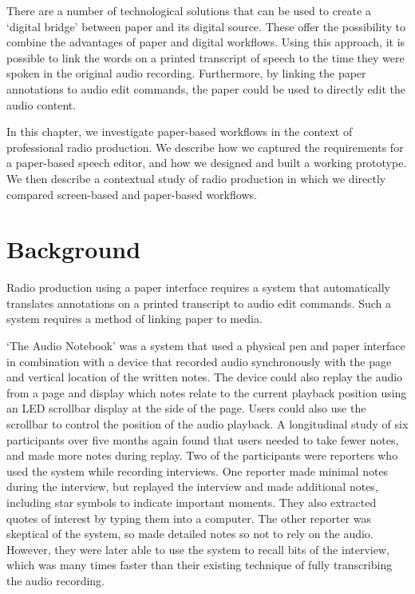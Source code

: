 There are a number of technological solutions that can be used to create a `digital bridge' between paper and
its digital source. These offer the possibility to combine the advantages of paper and digital workflows. Using this
approach, it is possible to link the words on a printed transcript of speech to the time they were spoken in the
original audio recording. Furthermore, by linking the paper annotations to audio edit commands, the paper could be used
to directly edit the audio content.

In this chapter, we investigate paper-based workflows in the context of professional radio production. We describe how
we captured the requirements for a paper-based speech editor, and how we designed and built a working prototype. We
then describe a contextual study of radio production in which we directly compared screen-based and paper-based
workflows. 

\section{Background}\label{sec:paper-background}
Radio production using a paper interface requires a system that automatically translates annotations on a printed
transcript to audio edit commands. Such a system requires a method of linking paper to media.

`The Audio Notebook' \citep{Stifelman2001} was a system that used a physical pen and paper interface in combination
with a device that recorded audio synchronously with the page and vertical location of the written notes.  The device
could also replay the audio from a page and display which notes relate to the current playback position using an LED
scrollbar display at the side of the page. Users could also use the scrollbar to control the position of the audio
playback.  A longitudinal study of six participants over five months again found that users needed to take fewer notes,
and made more notes during replay. Two of the participants were reporters who used the system while recording
interviews. One reporter made minimal notes during the interview, but replayed the interview and made additional notes,
including star symbols to indicate important moments. They also extracted quotes of interest by typing them into a
computer. The other reporter was skeptical of the system, so made detailed notes so not to rely on the audio. However,
they were later able to use the system to recall bits of the interview, which was many times faster than their existing
technique of fully transcribing the audio recording.

